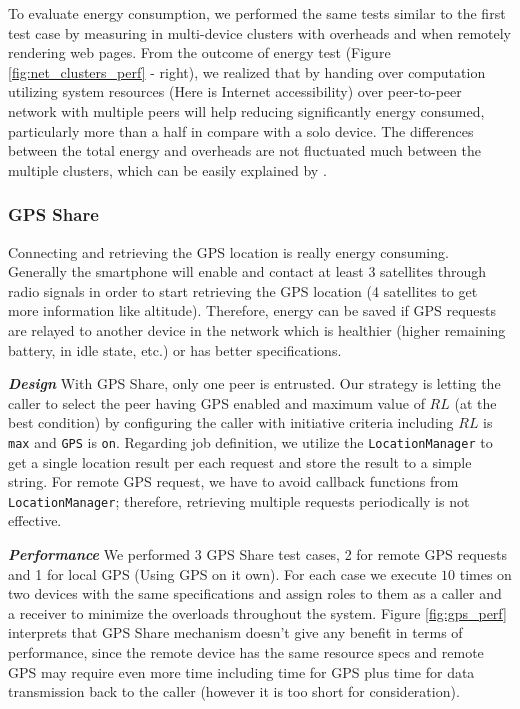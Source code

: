 \documentclass{sig-alternate}[10pt]
\begin{document}
\begin{CCSXML}
To evaluate energy consumption, we performed the same tests similar to the first test case by measuring in multi-device clusters with overheads and when remotely rendering web pages. From the outcome of energy test (Figure \ref{fig:net_clusters_perf} - right), we realized that by handing over computation utilizing system resources (Here is Internet accessibility) over peer-to-peer network with multiple peers will help reducing significantly energy consumed, particularly more than a half in compare with a solo device. The differences between the total energy and overheads are not fluctuated much between the multiple clusters, which can be easily explained by \cite{wifi_energy}.\\


\subsubsection{GPS Share}
Connecting and retrieving the GPS location is really energy consuming. Generally the smartphone will enable and contact at least 3 satellites through radio signals in order to start retrieving the GPS location (4 satellites to get more information like altitude). Therefore, energy can be saved if GPS requests are relayed to another device in the network which is healthier (higher remaining battery, in idle state, etc.) or has better specifications.

\textbf{\emph{Design}}
With GPS Share, only one peer is entrusted. Our strategy is letting the caller to select the peer having GPS enabled and maximum value of $RL$ (at the best condition) by configuring the caller with initiative criteria including $RL$ is \texttt{max} and \texttt{GPS} is \texttt{on}. Regarding job definition, we utilize the \texttt{LocationManager} to get a single location result per each request and store the result to a simple string. For remote GPS request, we have to avoid callback functions from \texttt{LocationManager}; therefore, retrieving multiple requests periodically is not effective.


\textbf{\emph{Performance}}
We performed 3 GPS Share test cases, 2 for remote GPS requests and 1 for local GPS (Using GPS on it own). For each case we execute $10$ times on two devices with the same specifications and assign roles to them as a caller and a receiver to minimize the overloads throughout the system. Figure \ref{fig:gps_perf} interprets that GPS Share mechanism doesn't give any benefit in terms of performance, since the remote device has the same resource specs and remote GPS may require even more time including time for GPS plus time for data transmission back to the caller (however it is too short for consideration).


\end{CCSXML}
\end{document}

